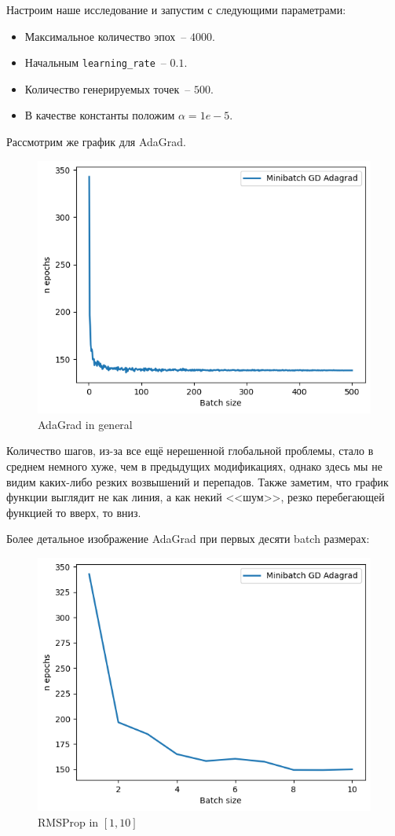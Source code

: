 \documentclass[12pt, a4paper, oneside, final]{article}
\begin{document}
	Настроим наше исследование и запустим с следующими параметрами:
	\begin{itemize}
		\item Максимальное количество эпох~-- $4000$.
		\item Начальным \texttt{learning\_rate}~-- $0.1$.
		\item Количество генерируемых точек~-- $500$.
		\item В качестве константы положим $\alpha = 1e-5$.
	\end{itemize}
	Рассмотрим же график для AdaGrad.
	\begin{figure}[H]
		\centering
		\includegraphics[scale = 0.9]{Image/T3_ADAGRAD_GENERAL.png}
		\caption*{AdaGrad in general}
	\end{figure}
	Количество шагов, из-за все ещё нерешенной глобальной проблемы, стало в среднем немного хуже, чем в предыдущих модификациях, однако здесь мы не видим каких-либо резких возвышений и перепадов.
	Также заметим, что график функции выглядит не как линия, а как некий <<шум>>, резко перебегающей функцией то вверх, то вниз.

	Более детальное изображение AdaGrad при первых десяти batch размерах:
	\begin{figure}[H]
		\centering
		\includegraphics[scale = 0.9]{Image/T3_ADAGRAD_1_10.png}
		\caption*{RMSProp in $[1, 10]$}
	\end{figure}
\end{document}
